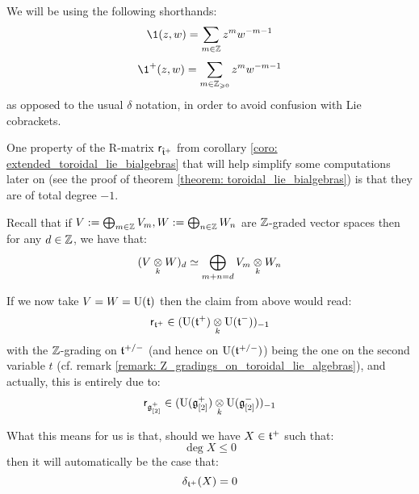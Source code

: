         \begin{convention} \label{conv: formal_dirac_distributions}
            We will be using the following shorthands:
                $$\1(z, w) = \sum_{m \in \Z} z^m w^{-m - 1}$$
                $$\1^+(z, w) = \sum_{m \in \Z_{\geq 0}} z^m w^{-m - 1}$$
            as opposed to the usual $\delta$ notation, in order to avoid confusion with Lie cobrackets.
        \end{convention}

        \begin{remark} \label{remark: total_degrees_of_classical_yangian_R_matrices}
            One property of the R-matrix $\mathsf{r}_{\hat{\mathfrak{t}}^{+}}$ from corollary \ref{coro: extended_toroidal_lie_bialgebras} that will help simplify some computations later on (see the proof of theorem \ref{theorem: toroidal_lie_bialgebras}) is that they are of total degree $-1$. 

            Recall that if $V := \bigoplus_{m \in \mathbb{Z}} V_m, W := \bigoplus_{n \in \mathbb{Z}} W_n$ are $\mathbb{Z}$-graded vector spaces then for any $d \in \mathbb{Z}$, we have that:
                $$(V \tensor_k W)_d \cong \bigoplus_{m + n = d} V_m \tensor_k W_n$$
                
            If we now take $V = W = \mathrm{U}(\mathfrak{t})$ then the claim from above would read:
                $$\sfr_{\toroidal^{\positive}} \in ( \rmU(\toroidal^{\positive}) \tensor_k \rmU(\toroidal^{\negative}) )_{-1}$$
            with the $\mathbb{Z}$-grading on $\mathfrak{t}^{+/-}$ (and hence on $\mathrm{U}(\mathfrak{t}^{+/-})$) being the one on the second variable $t$ (cf. remark \ref{remark: Z_gradings_on_toroidal_lie_algebras}), and actually, this is entirely due to:
                $$\sfr_{\g_{[2]}^{\positive}} \in ( \rmU(\g_{[2]}^{\positive}) \tensor_k \rmU(\g_{[2]}^{\negative}) )_{-1}$$

            What this means for us is that, should we have $X \in \mathfrak{t}^{+}$ such that:
                $$\deg X \leq 0$$
            then it will automatically be the case that:
                $$\delta_{\mathfrak{t}^{+}}(X) = 0$$
        \end{remark}
        

